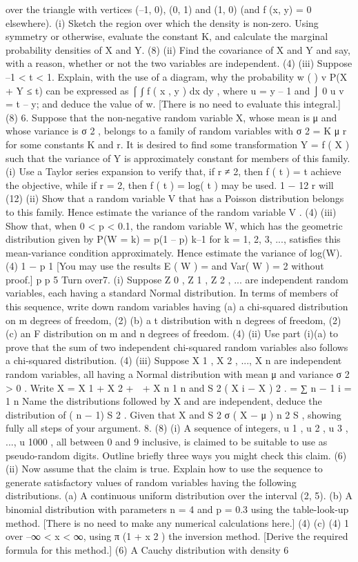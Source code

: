over the triangle with vertices (–1, 0), (0, 1) and (1, 0) (and f (x, y) = 0 elsewhere).
(i) Sketch the region over which the density is non-zero. Using symmetry or
otherwise, evaluate the constant K, and calculate the marginal probability
densities of X and Y.
(8)
(ii) Find the covariance of X and Y and say, with a reason, whether or not the two
variables are independent.
(4)
(iii) Suppose –1 < t < 1. Explain, with the use of a diagram, why the probability
w
(
)
v
P(X + Y ≤ t) can be expressed as ⌠ ∫ f ( x , y ) dx dy , where u = y – 1 and
⌡ 0 u
v = t – y; and deduce the value of w. [There is no need to evaluate this
integral.]
(8)
6.
Suppose that the non-negative random variable X, whose mean is μ and whose
variance is σ 2 , belongs to a family of random variables with σ 2 = K μ r for some
constants K and r. It is desired to find some transformation Y = f ( X ) such that the
variance of Y is approximately constant for members of this family.
(i)
Use a Taylor series expansion to verify that, if r ≠ 2, then f ( t ) = t
achieve the objective, while if r = 2, then f ( t ) = log( t ) may be used.
1 − 12 r
will
(12)
(ii) Show that a random variable V that has a Poisson distribution belongs to this
family. Hence estimate the variance of the random variable V .
(4)
(iii) Show that, when 0 < p < 0.1, the random variable W, which has the geometric
distribution given by P(W = k) = p(1 – p) k–1 for k = 1, 2, 3, ..., satisfies this
mean-variance condition approximately. Hence estimate the variance of
log(W).
(4)
1 − p
1
[You may use the results E ( W ) = and Var( W ) = 2 without proof.]
p
p
5
Turn over7.
(i)
Suppose {Z 0 , Z 1 , Z 2 , ...} are independent random variables, each having a
standard Normal distribution. In terms of members of this sequence, write
down random variables having
(a) a chi-squared distribution on m degrees of freedom, (2)
(b) a t distribution with n degrees of freedom, (2)
(c) an F distribution on m and n degrees of freedom. (4)
(ii) Use part (i)(a) to prove that the sum of two independent chi-squared random
variables also follows a chi-squared distribution.
(4)
(iii) Suppose {X 1 , X 2 , ..., X n } are independent random variables, all having a
Normal distribution with mean μ and variance σ 2 > 0 . Write
X =
X 1 + X 2 +  + X n
1 n
and S 2
( X i − X ) 2 .
=
∑
n − 1 i = 1
n
Name the distributions followed by X and
are independent, deduce the distribution of
( n − 1) S 2
. Given that X and S 2
σ
( X − μ ) n
2
S
, showing fully all steps
of your argument.
8.
(8)
(i) A sequence of integers, {u 1 , u 2 , u 3 , ..., u 1000 }, all between 0 and 9 inclusive, is
claimed to be suitable to use as pseudo-random digits. Outline briefly three
ways you might check this claim.
(6)
(ii) Now assume that the claim is true. Explain how to use the sequence to
generate satisfactory values of random variables having the following
distributions.
(a) A continuous uniform distribution over the interval (2, 5).
(b) A binomial distribution with parameters n = 4 and p = 0.3 using the
table-look-up method. [There is no need to make any numerical
calculations here.]
(4)
(c)
(4)
1
over –∞ < x < ∞, using
π (1 + x 2 )
the inversion method. [Derive the required formula for this method.]
(6)
A Cauchy distribution with density
6
